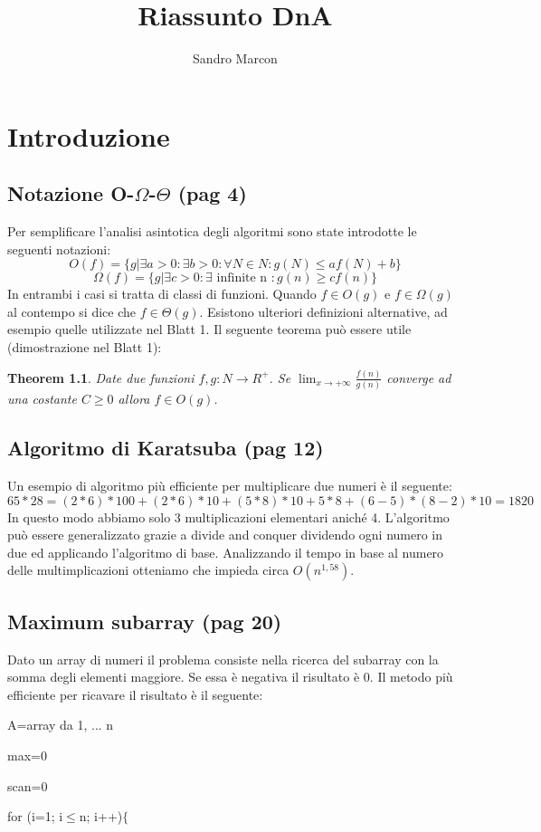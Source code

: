 \documentclass[12pt,a4paper]{book}
\author{Sandro Marcon}
\title{Riassunto DnA}
\begin{document}
\chapter{Introduzione}
\section{Notazione O-$\Omega$-$\Theta$ (pag 4)}
Per semplificare l'analisi asintotica degli algoritmi sono state introdotte le 
seguenti notazioni:
$$O(f)=\{ g|\exists a>0: \exists b>0: \forall N \in N : g(N)\leq af(N)+b \}$$
$$\Omega (f)=\{ g|\exists c>0: \exists \mbox{ infinite n } : g(n) \geq cf(n) \}$$
In entrambi i casi si tratta di classi di funzioni. Quando $f \in O(g)$ e $f \in \Omega (g)$ al contempo si dice che $f \in \Theta (g)$. Esistono ulteriori definizioni alternative, ad esempio quelle utilizzate nel Blatt 1. Il seguente teorema può essere utile (dimostrazione nel Blatt 1):
\newtheorem{theorem}{Theorem}
\begin{theorem}
Date due funzioni $ f,g: N \rightarrow R^{+} $. Se $ \lim_{x \rightarrow +\infty} \frac{f(n)}{g(n)} $ converge ad una costante $C\geq 0$ allora $f \in O(g)$.
\end{theorem}
\section{Algoritmo di Karatsuba (pag 12)}
Un esempio di algoritmo più efficiente per multiplicare due numeri è il seguente:
$$65 * 28 = (2 * 6) * 100 + (2 * 6) * 10 + (5 * 8) * 10 + 5 * 8 + (6-5)*(8-2) * 10 = 1820 $$
In questo modo abbiamo solo 3 multiplicazioni elementari aniché 4. L'algoritmo può essere generalizzato grazie a divide and conquer dividendo ogni numero in due ed applicando l'algoritmo di base. Analizzando il tempo in base al numero delle multimplicazioni otteniamo che impieda circa $O(n^{1,58})$.
\section{Maximum subarray (pag 20)}
Dato un array di numeri il problema consiste nella ricerca del subarray con la somma degli elementi maggiore. Se essa è negativa il risultato è 0. Il metodo più efficiente per ricavare il risultato è il seguente:

	A=array da 1, ... n
	
	max=0
	
	scan=0
	
	for (i=1; i$\leq$n; i++)$\{$
	
\end{document}
